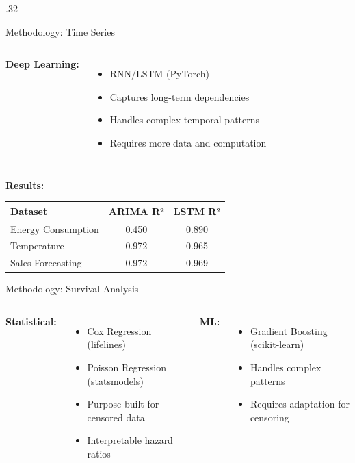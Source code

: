 \documentclass[final]{beamer}
\begin{document}
\begin{frame}[t]
\begin{columns}[t]
\begin{column}{.32\linewidth}
\begin{block}{Methodology: Time Series}
\begin{columns}[t]
\textcolor{dlcolor}{\textbf{Deep Learning:}}
\begin{itemize}
    \item RNN/LSTM (PyTorch)
    \item Captures long-term dependencies
    \item Handles complex temporal patterns
    \item Requires more data and computation
\end{itemize}
\end{columns}

\vspace{0.3cm}
\textbf{Results:}
\begin{center}
\small
\begin{tabular}{lcc}
\toprule
\textbf{Dataset} & \textbf{ARIMA R²} & \textbf{LSTM R²} \\
\midrule
Energy Consumption & 0.450 & \textcolor{dlcolor}{0.890} \\
Temperature & \textcolor{statcolor}{0.972} & 0.965 \\
Sales Forecasting & \textcolor{statcolor}{0.972} & 0.969 \\
\bottomrule
\end{tabular}
\end{center}
\end{block}

\begin{block}{Methodology: Survival Analysis}
\begin{columns}[t]
\textcolor{statcolor}{\textbf{Statistical:}}
\begin{itemize}
    \item Cox Regression (lifelines)
    \item Poisson Regression (statsmodels)
    \item Purpose-built for censored data
    \item Interpretable hazard ratios
\end{itemize}

\textcolor{mlcolor}{\textbf{ML:}}
\begin{itemize}
    \item Gradient Boosting (scikit-learn)
    \item Handles complex patterns
    \item Requires adaptation for censoring
\end{itemize}
\end{columns}


\end{block}
\end{column}
\end{columns}
\end{frame}
\end{document}
